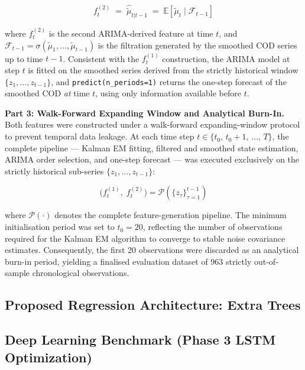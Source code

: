 \documentclass[conference]{IEEEtran}
\begin{document}
\begin{equation}
    f^{(2)}_t \;=\; \hat{\tilde{\mu}}_{t|t-1} \;=\; \mathbb{E}\!\left[\tilde{\mu}_{t} \mid \mathcal{F}_{t-1}\right]
    \label{eq:ksp2}
\end{equation}

where $f^{(2)}_t$ is the second ARIMA-derived feature at time $t$, and $\mathcal{F}_{t-1} = \sigma(\tilde{\mu}_1, \ldots, \tilde{\mu}_{t-1})$ is the filtration generated by the smoothed COD series up to time $t-1$. Consistent with the $f^{(1)}_t$ construction, the ARIMA model at step $t$ is fitted on the smoothed series derived from the strictly historical window $\{z_1,\ldots,z_{t-1}\}$, and \texttt{predict(n\_periods=1)} returns the one-step forecast of the smoothed COD \emph{at} time $t$, using only information available before $t$.

\textbf{Part 3: Walk-Forward Expanding Window and Analytical Burn-In.}
Both features were constructed under a walk-forward expanding-window protocol to prevent temporal data leakage. At each time step $t \in \{t_0,\, t_0\!+\!1,\, \ldots,\, T\}$, the complete pipeline --- Kalman EM fitting, filtered and smoothed state estimation, ARIMA order selection, and one-step forecast --- was executed exclusively on the strictly historical sub-series $\{z_1, \ldots, z_{t-1}\}$:

\begin{equation}
    \bigl(f^{(1)}_t,\; f^{(2)}_t\bigr) = \mathcal{P}\!\left(\{z_\tau\}_{\tau=1}^{t-1}\right)
    \label{eq:pipeline}
\end{equation}

where $\mathcal{P}(\cdot)$ denotes the complete feature-generation pipeline. The minimum initialisation period was set to $t_0 = 20$, reflecting the number of observations required for the Kalman EM algorithm to converge to stable noise covariance estimates. Consequently, the first 20 observations were discarded as an analytical burn-in period, yielding a finalised evaluation dataset of 963 strictly out-of-sample chronological observations.

\subsection{Proposed Regression Architecture: Extra Trees}


\subsection{Deep Learning Benchmark (Phase 3 LSTM Optimization)}
\end{document}

